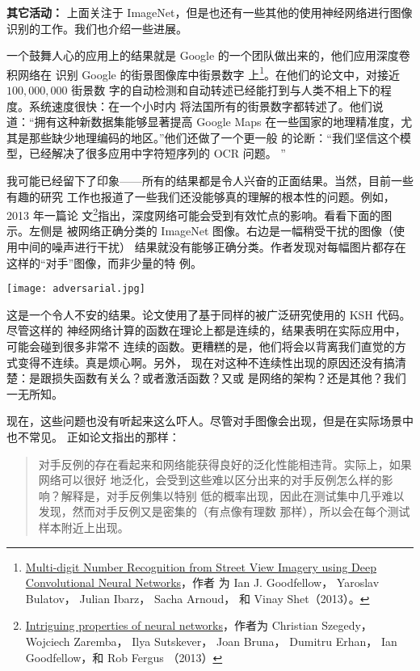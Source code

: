 \textbf{其它活动：} 上面关注于 ImageNet，但是也还有一些其他的使用神经网络进行图像
识别的工作。我们也介绍一些进展。

一个鼓舞人心的应用上的结果就是 Google 的一个团队做出来的，他们应用深度卷积网络在
识别 Google 的街景图像库中街景数字
上\footnote{\href{http://arxiv.org/abs/1312.6082}{Multi-digit Number Recognition
    from Street View Imagery using Deep Convolutional Neural Networks}，作者
  为 Ian J. Goodfellow， Yaroslav Bulatov， Julian Ibarz， Sacha
  Arnoud， 和 Vinay Shet（2013）。}。在他们的论文中，对接近 $100,000,000$ 街景数
字的自动检测和自动转述已经能打到与人类不相上下的程度。系统速度很快：在一个小时内
将法国所有的街景数字都转述了。他们说道：“拥有这种新数据集能够显著提高 Google
Maps 在一些国家的地理精准度，尤其是那些缺少地理编码的地区。”他们还做了一个更一般
的论断：“我们坚信这个模型，已经解决了很多应用中字符短序列的 OCR 问题。 ”

我可能已经留下了印象——所有的结果都是令人兴奋的正面结果。当然，目前一些有趣的研究
工作也报道了一些我们还没能够真的理解的根本性的问题。例如，2013 年一篇论
文\footnote{\href{http://arxiv.org/abs/1312.6199}{Intriguing properties of
    neural networks}，作者为 Christian Szegedy，Wojciech Zaremba， Ilya
  Sutskever， Joan Bruna， Dumitru Erhan， Ian Goodfellow，和 Rob
  Fergus （2013）}指出，深度网络可能会受到有效忙点的影响。看看下面的图示。左侧是
被网络正确分类的 ImageNet 图像。右边是一幅稍受干扰的图像（使用中间的噪声进行干扰）
结果就没有能够正确分类。作者发现对每幅图片都存在这样的“对手”图像，而非少量的特
例。

\begin{center}
  \texttt{[image: adversarial.jpg]}
\end{center}

这是一个令人不安的结果。论文使用了基于同样的被广泛研究使用的 KSH 代码。尽管这样的
神经网络计算的函数在理论上都是连续的，结果表明在实际应用中，可能会碰到很多非常不
连续的函数。更糟糕的是，他们将会以背离我们直觉的方式变得不连续。真是烦心啊。另外，
现在对这种不连续性出现的原因还没有搞清楚：是跟损失函数有关么？或者激活函数？又或
是网络的架构？还是其他？我们一无所知。

现在，这些问题也没有听起来这么吓人。尽管对手图像会出现，但是在实际场景中也不常见。
正如论文指出的那样：

\begin{quote}
  对手反例的存在看起来和网络能获得良好的泛化性能相违背。实际上，如果网络可以很好
  地泛化，会受到这些难以区分出来的对手反例怎么样的影响？解释是，对手反例集以特别
  低的概率出现，因此在测试集中几乎难以发现，然而对手反例又是密集的（有点像有理数
  那样），所以会在每个测试样本附近上出现。
\end{quote}

